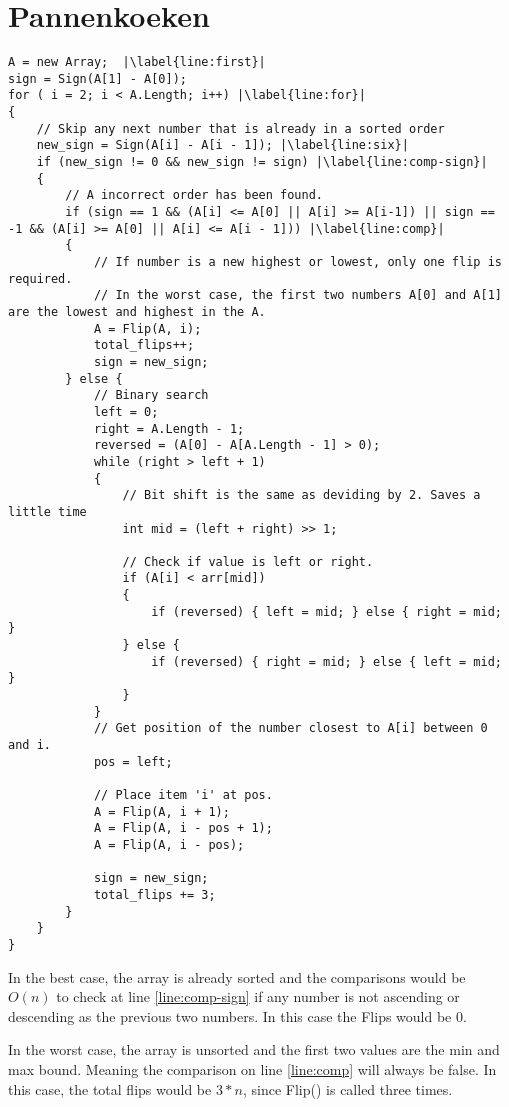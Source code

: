 \section{Pannenkoeken}


\begin{lstlisting}[caption=Insert Sort variant, escapechar=|]
A = new Array;  |\label{line:first}|
sign = Sign(A[1] - A[0]);
for ( i = 2; i < A.Length; i++) |\label{line:for}|
{
    // Skip any next number that is already in a sorted order
    new_sign = Sign(A[i] - A[i - 1]); |\label{line:six}|
    if (new_sign != 0 && new_sign != sign) |\label{line:comp-sign}|
    {
        // A incorrect order has been found.
        if (sign == 1 && (A[i] <= A[0] || A[i] >= A[i-1]) || sign == -1 && (A[i] >= A[0] || A[i] <= A[i - 1])) |\label{line:comp}|
        {
            // If number is a new highest or lowest, only one flip is required. 
            // In the worst case, the first two numbers A[0] and A[1] are the lowest and highest in the A.
            A = Flip(A, i);
            total_flips++;
            sign = new_sign;
        } else {
            // Binary search
            left = 0;
            right = A.Length - 1;
            reversed = (A[0] - A[A.Length - 1] > 0);
            while (right > left + 1)
            {
                // Bit shift is the same as deviding by 2. Saves a little time
                int mid = (left + right) >> 1;

                // Check if value is left or right.
                if (A[i] < arr[mid])
                {
                    if (reversed) { left = mid; } else { right = mid; } 
                } else {
                    if (reversed) { right = mid; } else { left = mid; }
                }
            }
            // Get position of the number closest to A[i] between 0 and i. 
            pos = left; 

            // Place item 'i' at pos.
            A = Flip(A, i + 1);
            A = Flip(A, i - pos + 1);
            A = Flip(A, i - pos);

            sign = new_sign;
            total_flips += 3;
        }
    }
}
\end{lstlisting}

In the best case, the array is already sorted and the comparisons would be $O(n)$ to check at line \ref{line:comp-sign} if any number is not ascending or descending as the previous two numbers. In this case the Flips would be 0.

In the worst case, the array is unsorted and the first two values are the min and max bound. Meaning the comparison on line \ref{line:comp} will always be false. In this case, the total flips would be $3*n$, since Flip() is called three times.

